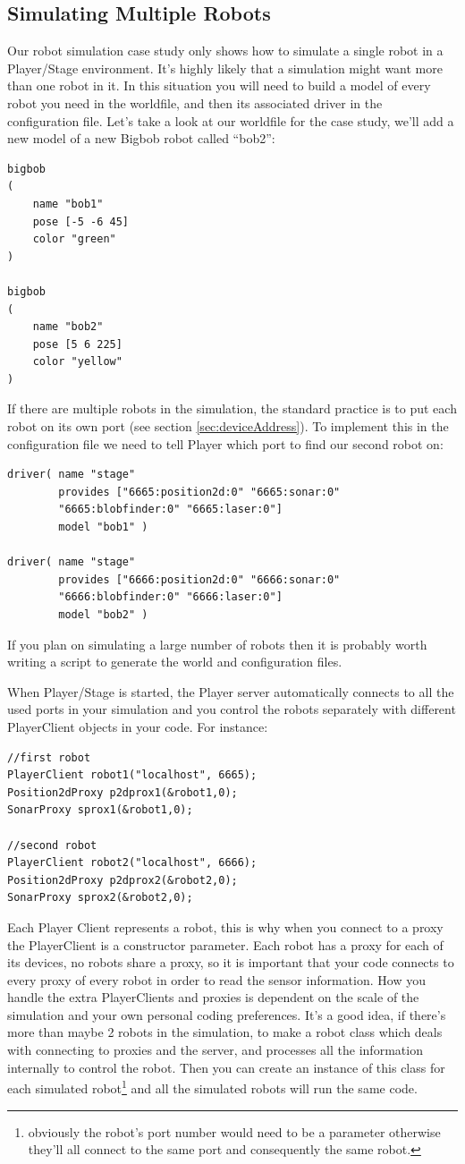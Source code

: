 \documentclass[a4paper]{article}
\newcommand{\plst}{Player/Stage\xspace}
\newcommand{\pl}{Player\xspace}
\begin{document}
\subsection{Simulating Multiple Robots}
Our robot simulation case study only shows how to simulate a single robot in a \plst environment. It's highly likely that a simulation might want more than one robot in it. In this situation you will need to build a model of every robot you need in the worldfile, and then its associated driver in the configuration file. Let's take a look at our worldfile for the case study, we'll add a new model of a new Bigbob robot called ``bob2'':
\begin{verbatim}
bigbob
(
	name "bob1"
	pose [-5 -6 45]
	color "green"
)

bigbob
(
	name "bob2"
	pose [5 6 225]
	color "yellow"
)
\end{verbatim}
If there are multiple robots in the simulation, the standard practice is to put each robot on its own port (see section \ref{sec:deviceAddress}). To implement this in the configuration file we need to tell \pl which port to find our second robot on:
\begin{verbatim}
driver( name "stage" 
        provides ["6665:position2d:0" "6665:sonar:0" 
        "6665:blobfinder:0" "6665:laser:0"] 
        model "bob1" )

driver( name "stage" 
        provides ["6666:position2d:0" "6666:sonar:0" 
        "6666:blobfinder:0" "6666:laser:0"] 
        model "bob2" )
\end{verbatim}
If you plan on simulating a large number of robots then it is probably worth writing a script to generate the world and configuration files.

When \plst is started, the \pl server automatically connects to all the used ports in your simulation and you control the robots separately with different PlayerClient objects in your code. For instance:
\begin{verbatim}
//first robot
PlayerClient robot1("localhost", 6665);
Position2dProxy p2dprox1(&robot1,0);
SonarProxy sprox1(&robot1,0);

//second robot
PlayerClient robot2("localhost", 6666);
Position2dProxy p2dprox2(&robot2,0);
SonarProxy sprox2(&robot2,0);
\end{verbatim}
Each \pl Client represents a robot, this is why when you connect to a proxy the PlayerClient is a constructor parameter. Each robot has a proxy for each of its devices, no robots share a proxy, so it is important that your code connects to every proxy of every robot in order to read the sensor information.
How you handle the extra PlayerClients and proxies is dependent on the scale of the simulation and your own personal coding preferences. It's a good idea, if there's more than maybe 2 robots in the simulation, to make a robot class which deals with connecting to proxies and the server, and processes all the information internally to control the robot. Then you can create an instance of this class for each simulated robot\footnote{obviously the robot's port number would need to be a parameter otherwise they'll all connect to the same port and consequently the same robot.} and all the simulated robots will run the same code.
\end{document}
